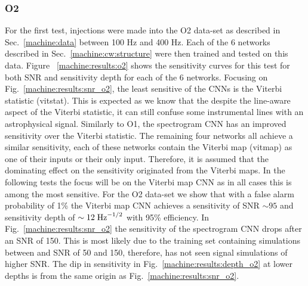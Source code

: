 \subsubsection{O2}

%
For the first test, injections were made into the O2 data-set as described in
Sec.~\ref{machine:data} between 100 Hz and 400 Hz. Each of the 6 networks described in
Sec.~\ref{machine:cw:structure} were then trained and tested on this data.
Figure ~\ref{machine:results:o2} shows the sensitivity curves for
this test for both \gls{SNR} and sensitivity depth for each of the 6 networks.
Focusing on Fig.~\ref{machine:results:snr_o2}, the least sensitive of the \glspl{CNN} is the
Viterbi statistic (vitstat). This is
expected as we know that the despite the line-aware aspect of the Viterbi statistic, it can still confuse some instrumental lines with an astrophysical signal. 
Similarly to O1, the spectrogram \gls{CNN} has an improved sensitivity over the Viterbi statistic.
The remaining four networks all achieve a similar sensitivity, each of these
networks contain the Viterbi map (vitmap) as one of their inputs or their only
input. Therefore, it is assumed that the dominating effect on the sensitivity
originated from the Viterbi maps.  In the following tests the focus
will be on the Viterbi map \gls{CNN} as in all cases this is among the most
sensitive. For the O2 data-set we show that with a false
alarm probability of 1\% the Viterbi map \gls{CNN} achieves a
sensitivity of \gls{SNR} $\sim 95$ and sensitivity depth of $\sim 12\; {\rm Hz}^{-1/2}$
with 95\% efficiency.
In Fig.~\ref{machine:results:snr_o2} the sensitivity of the spectrogram \gls{CNN} drops after an \gls{SNR} of 150. 
This is most likely due to the training set containing simulations between and \gls{SNR} of 50 and 150, therefore, has not seen signal simulations of higher \gls{SNR}.
The dip in sensitivity in Fig.~\ref{machine:results:depth_o2} at lower depths is from the same origin as Fig.~\ref{machine:results:snr_o2}. 


